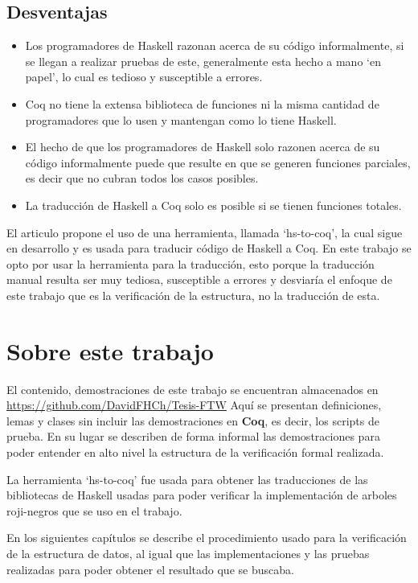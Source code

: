 \documentclass[8pt,leqno,pdflatex,spanish]{book}
\newcommand{\coq}{\textbf{Coq}}
\newcommand{\arns}{arboles roji-negros}
\theoremstyle{plain}
\theoremstyle{definition}
\theoremstyle{remark}
\begin{document}
\subsection{Desventajas}
\begin{itemize}
    \item Los programadores de Haskell razonan acerca de su código informalmente, si se llegan a 
    realizar pruebas de este, generalmente esta hecho a mano `en papel', lo cual es tedioso y 
    susceptible a errores.
    \item Coq no tiene la extensa biblioteca de funciones ni la misma cantidad de programadores 
    que lo usen y mantengan como lo tiene Haskell.
    \item El hecho de que los programadores de Haskell solo razonen acerca de su código 
    informalmente puede que resulte en que se generen funciones parciales, es decir que no cubran 
    todos los casos posibles.
    \item La traducci\'on de Haskell a Coq solo es posible si se tienen funciones totales.
\end{itemize}

El articulo propone el uso de una herramienta, llamada `hs-to-coq', la cual sigue en desarrollo y 
es usada para traducir código de Haskell a Coq. En este trabajo se opto por usar la herramienta 
para la traducci\'on, esto porque la traducci\'on manual resulta ser muy tediosa, susceptible a 
errores y desviaría el enfoque de este trabajo que es la verificaci\'on de la estructura, no la 
traducci\'on de esta.

\section {Sobre este trabajo}
El contenido, demostraciones de este trabajo se encuentran almacenados en 
\url{https://github.com/DavidFHCh/Tesis-FTW} Aqu\'i se presentan definiciones, lemas y clases sin 
incluir las demostraciones en {\coq}, es decir, los scripts de prueba. En su lugar se describen de 
forma informal las demostraciones para poder entender en alto nivel la estructura de la 
verificaci\'on formal realizada.

La herramienta `hs-to-coq' fue usada para obtener las traducciones de las bibliotecas de Haskell 
usadas para poder verificar la implementación de {\arns} que se uso en el trabajo.

En los siguientes capítulos se describe el procedimiento usado para la verificaci\'on de la 
estructura de datos, al igual que las implementaciones y las pruebas realizadas para poder obtener 
el resultado que se buscaba.
\end{document}
